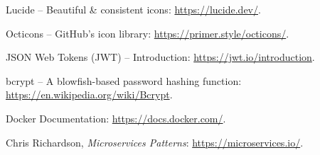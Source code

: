 \begin{enumerate}[leftmargin=2em,label={[\arabic*]}]
\item Lucide -- Beautiful \& consistent icons: \url{https://lucide.dev/}.
\item Octicons -- GitHub's icon library: \url{https://primer.style/octicons/}.
\item JSON Web Tokens (JWT) -- Introduction: \url{https://jwt.io/introduction}.
\item bcrypt -- A blowfish-based password hashing function: \url{https://en.wikipedia.org/wiki/Bcrypt}.
\item Docker Documentation: \url{https://docs.docker.com/}.
\item Chris Richardson, \textit{Microservices Patterns}: \url{https://microservices.io/}.
\end{enumerate}
